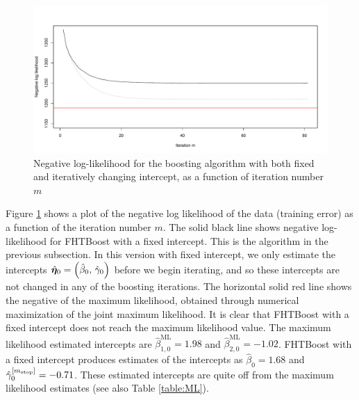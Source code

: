 \begin{figure}
\caption{Negative log-likelihood for the boosting algorithm with both fixed and iteratively changing intercept, as a function of iteration number $m$}
\label{fig:boosting-ML}
\centering\includegraphics[scale=0.4]{figures/small_example.pdf}
\end{figure}
Figure \ref{fig:boosting-ML} shows a plot of the negative log likelihood of the data (training error) as a function of the iteration number $m$.
The solid black line shows negative log-likelihood for FHTBoost with a fixed intercept.
This is the algorithm in the previous subsection.
In this version with fixed intercept, we only estimate the intercepts $\hat{\boldsymbol{\eta}}_0=\left(\hat{\beta}_{0},\,\hat{\gamma}_{0}\right)$ before we begin iterating, and so these intercepts are not changed in any of the boosting iterations.
The horizontal solid red line shows the negative of the maximum likelihood, obtained through numerical maximization of the joint maximum likelihood.
It is clear that FHTBoost with a fixed intercept does not reach the maximum likelihood value.
The maximum likelihood estimated intercepts are $\hat{\beta}^{\text{ML}}_{1,0}=1.98$ and $\hat{\beta}^{\text{ML}}_{2,0}=-1.02$.
FHTBoost with a fixed intercept produces estimates of the intercepts as $\hat{\beta}_{0}=1.68$ and $\hat{\gamma}^{[m_{\text{stop}}]}_{0}=-0.71$.
These estimated intercepts are quite off from the maximum likelihood estimates (see also Table \ref{table:ML}).


